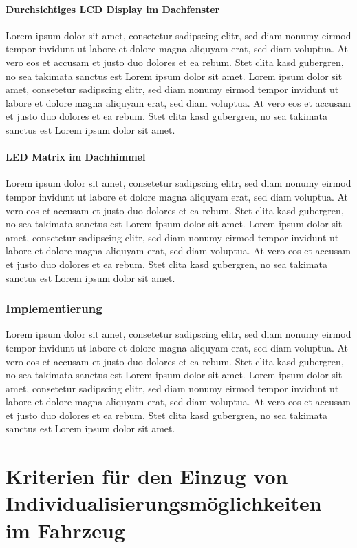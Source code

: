 \subsubsection{Durchsichtiges LCD Display im Dachfenster}
Lorem ipsum dolor sit amet, consetetur sadipscing elitr, sed diam nonumy eirmod tempor invidunt ut labore et dolore magna aliquyam erat, sed diam voluptua. At vero eos et accusam et justo duo dolores et ea rebum. Stet clita kasd gubergren, no sea takimata sanctus est Lorem ipsum dolor sit amet. Lorem ipsum dolor sit amet, consetetur sadipscing elitr, sed diam nonumy eirmod tempor invidunt ut labore et dolore magna aliquyam erat, sed diam voluptua. At vero eos et accusam et justo duo dolores et ea rebum. Stet clita kasd gubergren, no sea takimata sanctus est Lorem ipsum dolor sit amet.
\subsubsection{LED Matrix im Dachhimmel}
Lorem ipsum dolor sit amet, consetetur sadipscing elitr, sed diam nonumy eirmod tempor invidunt ut labore et dolore magna aliquyam erat, sed diam voluptua. At vero eos et accusam et justo duo dolores et ea rebum. Stet clita kasd gubergren, no sea takimata sanctus est Lorem ipsum dolor sit amet. Lorem ipsum dolor sit amet, consetetur sadipscing elitr, sed diam nonumy eirmod tempor invidunt ut labore et dolore magna aliquyam erat, sed diam voluptua. At vero eos et accusam et justo duo dolores et ea rebum. Stet clita kasd gubergren, no sea takimata sanctus est Lorem ipsum dolor sit amet.

\subsection{Implementierung}
Lorem ipsum dolor sit amet, consetetur sadipscing elitr, sed diam nonumy eirmod tempor invidunt ut labore et dolore magna aliquyam erat, sed diam voluptua. At vero eos et accusam et justo duo dolores et ea rebum. Stet clita kasd gubergren, no sea takimata sanctus est Lorem ipsum dolor sit amet. Lorem ipsum dolor sit amet, consetetur sadipscing elitr, sed diam nonumy eirmod tempor invidunt ut labore et dolore magna aliquyam erat, sed diam voluptua. At vero eos et accusam et justo duo dolores et ea rebum. Stet clita kasd gubergren, no sea takimata sanctus est Lorem ipsum dolor sit amet.


\chapter{Kriterien für den Einzug von Individualisierungsmöglichkeiten im Fahrzeug }
\label{cha:Kriterien}


